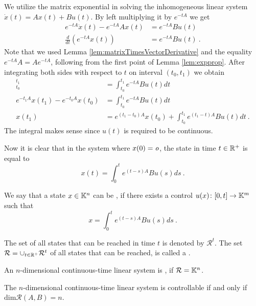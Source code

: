 We utilize the matrix exponential in solving the inhomogeneous linear system $\dot{x}(t)=Ax(t)+Bu(t)$. By left multiplying it by $e^{-tA}$ we get
\begin{align*}
	e^{-tA}\dot{x}(t)-e^{-tA}Ax(t) &=e^{-tA}Bu(t) \\
	\frac{d}{dt} (e^{-tA}x(t)) &=e^{-tA}Bu(t)\ .
\end{align*}
Note that we used Lemma \ref{lem:matrixTimesVectorDerivative} and the equality $e^{-tA}A=Ae^{-tA}$, following from the first point of Lemma \ref{lem:expprop}. After integrating both sides with respect to $t$ on interval $(t_0,t_1)$ we obtain
\begin{align*}
	[e^{-tA}x(t)]^{t_1}_{t_0}&=\int^{t_1}_{t_0}e^{-tA}Bu(t)dt \\
	e^{-t_1A}x(t_1)-e^{-t_0A}x(t_0)&=\int^{t_1}_{t_0}e^{-tA}Bu(t)dt \\
	x(t_1)&=e^{(t_1-t_0)A}x(t_0)+\int^{t_1}_{t_0}e^{(t_1-t)A}Bu(t)dt\ .
\end{align*}
The integral makes sense since $u(t)$ is required to be continuous.

Now it is clear that in the system where $x(0)=\textit{o}$, the state in time $t\in \mathbb{R}^+$ is equal to
\begin{equation}
\label{eq:coolVzorec}
	x(t)=\int^t_0 e^{(t-s)A}Bu(s)ds\ .
\end{equation}

\begin{definition}
	We say that a state $x\in\mathbb{K}^n$ can be , if there exists a control $u(x)\colon[0,t]\rightarrow\mathbb{K}^m$ such that
	$$x=\int^t_0 e^{(t-s)A}Bu(s)ds\ .$$

	The set of all states that can be reached in time $t$ is denoted by $\mathcal{R}^t$. The set $\mathcal{R}=\cup_{t\in\mathbb{R}^+}\mathcal{R}^t$ of all states that can be reached, is called a .
\end{definition}

\begin{definition}
	An $n$-dimensional continuous-time linear system is , if $\mathcal{R}=\mathbb{K}^n$.
\end{definition}

\begin{theorem}
	The $n$-dimensional continuous-time linear system is controllable if and only if $\text{dim}\mathcal{R}(A,B)=n$.
\end{theorem}

